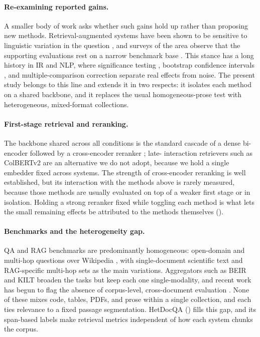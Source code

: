 \documentclass[10pt,twocolumn]{article}
\begin{document}
\paragraph{Re-examining reported gains.}
A smaller body of work asks whether such gains hold up rather than proposing new
methods. Retrieval-augmented systems have been shown to be sensitive to
linguistic variation in the question \cite{cao2025outofstyle}, and surveys of the
area observe that the supporting evaluations rest on a narrow benchmark base
\cite{oche2025ragreview,sharma2025ragsurvey}. This stance has a long history in IR
and NLP, where significance testing \cite{smucker2007sigtest}, bootstrap
confidence intervals \cite{efron1979bootstrap}, and multiple-comparison correction
\cite{holm1979,benjamini1995fdr} separate real effects from noise. The present
study belongs to this line and extends it in two respects: it isolates each
method on a shared backbone, and it replaces the usual homogeneous-prose test
with heterogeneous, mixed-format collections.

\paragraph{First-stage retrieval and reranking.}
The backbone shared across all conditions is the standard cascade of a dense
bi-encoder \cite{karpukhin2020dpr,izacard2022contriever,chen2024bgem3} followed by
a cross-encoder reranker \cite{reimers2019sbert,nogueira2020monot5}; late-%
interaction retrievers such as ColBERTv2 \cite{santhanam2022colbertv2} are an
alternative we do not adopt, because we hold a single embedder fixed across systems. The
strength of cross-encoder reranking is well established, but its interaction with
the methods above is rarely measured, because those methods are usually
evaluated on top of a weaker first stage or in isolation. Holding a strong
reranker fixed while toggling each method is what lets the small remaining
effects be attributed to the methods themselves ().

\paragraph{Benchmarks and the heterogeneity gap.}
QA and RAG benchmarks are predominantly homogeneous: open-domain and multi-hop
questions over Wikipedia \cite{kwiatkowski2019nq,yang2018hotpotqa,%
trivedi2022musique,ho2020twowiki,joshi2017triviaqa}, with single-document
scientific text \cite{dasigi2021qasper,pang2022quality} and RAG-specific
multi-hop sets \cite{tang2024multihoprag} as the main variations. Aggregators such
as BEIR \cite{thakur2021beir} and KILT \cite{petroni2021kilt} broaden the tasks
but keep each one single-modality, and recent work has begun to flag the absence
of corpus-level, cross-document evaluation \cite{luo2025globalrag}. None of these
mixes code, tables, PDFs, and prose within a single collection, and each ties
relevance to a fixed passage segmentation. HetDocQA () fills
this gap, and its span-based labels make retrieval metrics independent of how each
system chunks the corpus.
\end{document}
